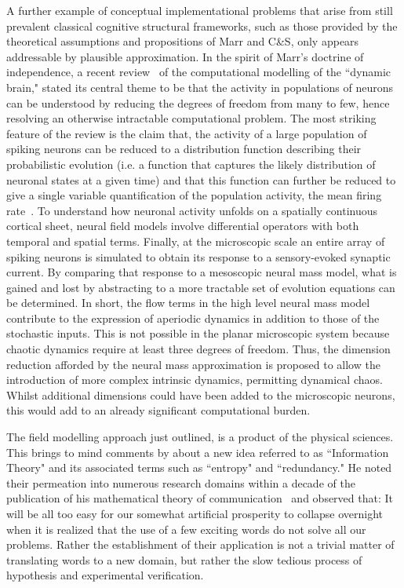 \documentclass[11pt,3p,twocolumn]{JMN}
\begin{document}
A further example of conceptual implementational problems that arise from still prevalent classical cognitive structural frameworks, such as those provided by the theoretical assumptions and propositions of Marr and C\&S, only appears addressable by plausible approximation. In the spirit of Marr's doctrine of independence, a recent review~\citep{deco08} of the computational modelling of the ``dynamic brain," stated its central theme to be that the activity in populations of neurons can be understood by reducing the degrees of freedom from many to few, hence resolving an otherwise intractable computational problem. The most striking feature of the review is the claim that, the activity of a large population of spiking neurons can be reduced to a distribution function describing their probabilistic evolution (i.e. a function that captures the likely distribution of neuronal states at a given time) and that this function can further be reduced to give a single variable quantification of the population activity, the mean firing rate~\citep{deco08}. To understand how neuronal activity unfolds on a spatially continuous cortical sheet, neural field models involve differential operators with both temporal and spatial terms. Finally, at the microscopic scale an entire array of spiking neurons is simulated to obtain its response to a sensory-evoked synaptic current. By comparing that response to a mesoscopic neural mass model, what is gained and lost by abstracting to a more tractable set of evolution equations can be determined. In short, the flow terms in the high level neural mass model contribute to the expression of aperiodic dynamics in addition to those of the stochastic inputs. This is not possible in the planar microscopic system because chaotic dynamics require at least three degrees of freedom. Thus, the dimension reduction afforded by the neural mass approximation is proposed to allow the introduction of more complex intrinsic dynamics, permitting dynamical chaos. Whilst additional dimensions could have been added to the microscopic neurons, this would add to an already significant computational burden.

The field modelling approach just outlined, is a product of the physical sciences. This brings to mind comments by \citet{shannon56} about a new idea referred to as ``Information Theory" and its associated terms such as ``entropy" and ``redundancy." He noted their permeation into numerous research domains within a decade of the publication of his mathematical theory of communication~\citep{shannon48} and observed that: It will be all too easy for our somewhat artificial prosperity to collapse overnight when it is realized that the use of a few exciting words do not solve all our problems. Rather the establishment of their application is not a trivial matter of translating words to a new domain, but rather the slow tedious process of hypothesis and experimental verification.
\end{document}

